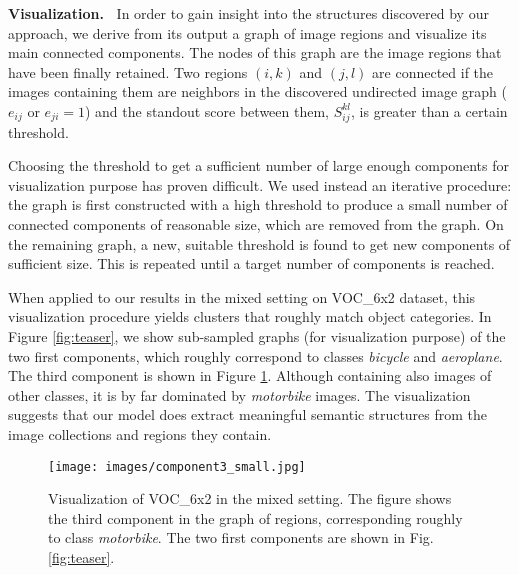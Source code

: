 \documentclass[10pt,twocolumn,letterpaper]{article}
\numberwithin{theorem}{section}
\newcommand{\parag}[1]{\vspace{4pt}\noindent\textbf{#1~}}
\begin{document}
\parag{Visualization.} 
In order to gain insight into the structures discovered by our approach, we derive from its output a graph of image regions and visualize its main connected components. The nodes of this graph are the image regions that have been finally retained. Two regions $(i,k)$ and $(j,l)$ are connected if the images containing them are neighbors in the discovered undirected image graph ($e_{ij}$ or $e_{ji} = 1$) and the standout score between them, $S_{ij}^{kl}$, is greater than a certain threshold.
   
Choosing the threshold to get a sufficient number of large enough components for visualization purpose has proven difficult. We used instead an iterative procedure: the graph is first constructed with a high threshold to produce a small number of connected components of reasonable size, which are removed from the graph. On the remaining graph, a new, suitable threshold is found to get new components of sufficient size. This is repeated until a target number of components is reached. 

When applied to our results in the mixed setting on VOC\_6x2 dataset, this visualization procedure yields clusters that roughly match object categories. In Figure \ref{fig:teaser}, we show sub-sampled graphs (for visualization purpose) of the two first components, which roughly correspond to classes \textit{bicycle} and \textit{aeroplane}. The third component is shown in Figure \ref{fig:component3}. Although containing also images of other classes, it is by far dominated by \textit{motorbike} images. The visualization suggests that our model does extract meaningful semantic structures from the image collections and regions they contain.

\begin{figure}
\begin{center}
\texttt{[image: images/component3\_small.jpg]}
\end{center}
\vspace{-6mm}
\caption{\small Visualization of VOC\_6x2 in the mixed setting. The figure shows the third component in the graph of regions, corresponding roughly to class \textit{motorbike}. The two first components are shown in Fig.\ref{fig:teaser}.}
\label{fig:component3}
\vspace{-4mm}
\end{figure}



 
\end{document}
